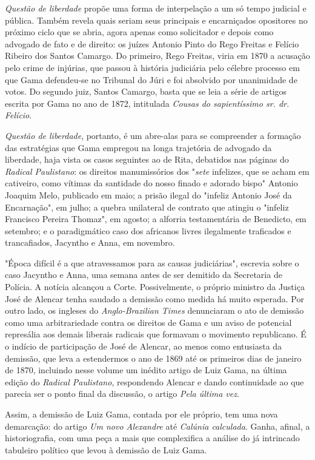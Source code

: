 \emph{Questão de liberdade} propõe uma forma de interpelação a um só
tempo judicial e pública. Também revela quais seriam seus principais e
encarniçados opositores no próximo ciclo que se abria, agora apenas como
solicitador e depois como advogado de fato e de direito: os juízes
Antonio Pinto do Rego Freitas e Felício Ribeiro dos Santos Camargo. Do
primeiro, Rego Freitas, viria em 1870 a acusação pelo crime de injúrias,
que passou à história judiciária pelo célebre processo em que Gama
defendeu-se no Tribunal do Júri e foi absolvido por unanimidade de
votos. Do segundo juiz, Santos Camargo, basta que se leia a série de
artigos escrita por Gama no ano de 1872, intitulada \emph{Cousas do
sapientíssimo sr. dr. Felício}.

\emph{Questão de liberdade}, portanto, é um abre-alas para se
compreender a formação das estratégias que Gama empregou na longa
trajetória de advogado da liberdade, haja vista os casos seguintes ao de
Rita, debatidos nas páginas do \emph{Radical Paulistano}: os direitos
manumissórios dos "\emph{sete} infelizes, que se acham em cativeiro,
como vítimas da santidade do nosso finado e adorado bispo" Antonio
Joaquim Melo, publicado em maio; a prisão ilegal do "infeliz Antonio
José da Encarnação", em julho; a quebra unilateral de contrato que
atingiu o "infeliz Francisco Pereira Thomaz", em agosto; a alforria
testamentária de Benedicto, em setembro; e o paradigmático caso dos
africanos livres ilegalmente traficados e trancafiados, Jacyntho e Anna,
em novembro.

"Época difícil é a que atravessamos para as causas judiciárias",
escrevia sobre o caso Jacyntho e Anna, uma semana antes de ser demitido
da Secretaria de Polícia. A notícia alcançou a Corte. Possivelmente, o
próprio ministro da Justiça José de Alencar tenha saudado a demissão
como medida há muito esperada. Por outro lado, os ingleses do
\emph{Anglo-Brazilian Times} denunciaram o ato de demissão como uma
arbitrariedade contra os direitos de Gama e um aviso de potencial
represália aos demais liberais radicais que formavam o movimento
republicano. É o indício de participação de José de Alencar, ao menos
como entusiasta da demissão, que leva a estendermos o ano de 1869 até os
primeiros dias de janeiro de 1870, incluindo nesse volume um inédito
artigo de Luiz Gama, na última edição do \emph{Radical Paulistano},
respondendo Alencar e dando continuidade ao que parecia ser o ponto
final da discussão, o artigo \emph{Pela última vez}.

Assim, a demissão de Luiz Gama, contada por ele próprio, tem uma nova
demarcação: do artigo \emph{Um novo Alexandre} até \emph{Calúnia
calculada}. Ganha, afinal, a historiografia, com uma peça a mais que
complexifica a análise do já intrincado tabuleiro político que levou à
demissão de Luiz Gama.

